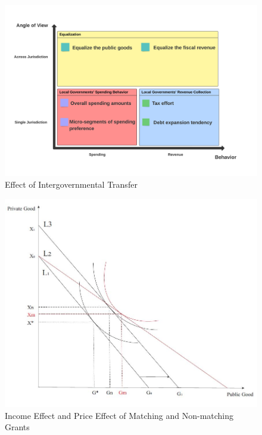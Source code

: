\begin{figure}[H]
    \centering
    \includegraphics[scale=0.4]{Chapter-4/Figures/Effect of Intergovernmental Transfer.jpeg}
    \caption{Effect of Intergovernmental Transfer
        \texttt{} }
    \label{Figure 3.1}
\end{figure}
\clearpage
\begin{figure}[H]
    \centering
    \includegraphics[scale=0.4]{Chapter-4/Figures/mfyeffect.jpg}
    \caption[Income Effect and Price Effect of Matching and Non-matching Grants]{Income Effect and Price Effect of Matching and Non-matching Grants
        \texttt{} }
    \label{Figure 3.3}
\end{figure}

